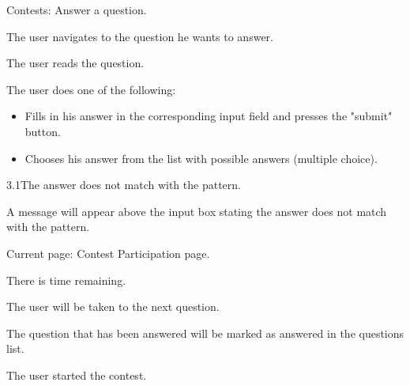 \begin{uc}{Contests: Answer a question.}

    \begin{uc-mss}
        \item The user navigates to the question he wants to answer. 
        \item The user reads the question.
        \item The user does one of the following:
        \begin{itemize}
            \item Fills in his answer in the corresponding input field and presses the "submit" button.
            \item Chooses his answer from the list with possible answers (multiple choice).
        \end{itemize}
    \end{uc-mss}

    \begin{uc-ext}

        \begin{uc-fail}{3.1}{The answer does not match with the pattern.}
            \item A message will appear above the input box stating the answer does not match with the pattern.
        \end{uc-fail}

    \end{uc-ext}

    \begin{uc-pre}
    \item Current page: Contest Participation page.
    \item There is time remaining.
    \end{uc-pre}

    \begin{uc-post}
    \item The user will be taken to the next question.
    \item The question that has been answered will be marked as answered in the questions list.
    \end{uc-post}

    \begin{uc-trig}
    The user started the contest.
    \end{uc-trig}

\end{uc}
